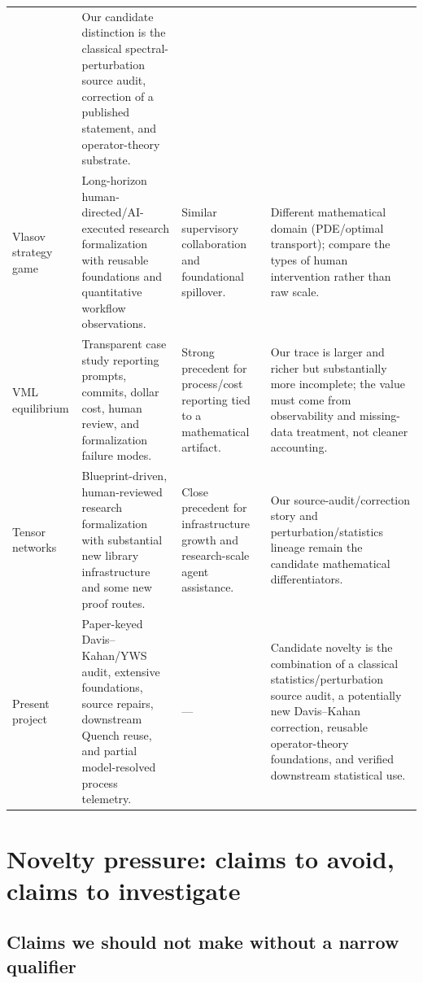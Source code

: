 \documentclass[11pt]{article}
\begin{document}
\begin{landscape}
\begin{table}[p]
\begin{tabularx}{\linewidth}{@{}p{3.0cm}p{6.2cm}p{6.2cm}X@{}}
 & Our candidate distinction is the classical spectral-perturbation source audit, correction of a published statement, and operator-theory substrate. \\
Vlasov strategy game \citep{miller2026vlasov}
 & Long-horizon human-directed/AI-executed research formalization with reusable foundations and quantitative workflow observations.
 & Similar supervisory collaboration and foundational spillover.
 & Different mathematical domain (PDE/optimal transport); compare the types of human intervention rather than raw scale. \\
VML equilibrium \citep{ilin2026vml}
 & Transparent case study reporting prompts, commits, dollar cost, human review, and formalization failure modes.
 & Strong precedent for process/cost reporting tied to a mathematical artifact.
 & Our trace is larger and richer but substantially more incomplete; the value must come from observability and missing-data treatment, not cleaner accounting. \\
Tensor networks \citep{lu2026tensor}
 & Blueprint-driven, human-reviewed research formalization with substantial new library infrastructure and some new proof routes.
 & Close precedent for infrastructure growth and research-scale agent assistance.
 & Our source-audit/correction story and perturbation/statistics lineage remain the candidate mathematical differentiators. \\
Present project
 & Paper-keyed Davis--Kahan/YWS audit, extensive foundations, source repairs, downstream Quench reuse, and partial model-resolved process telemetry.
 & ---
 & Candidate novelty is the combination of a classical statistics/perturbation source audit, a potentially new Davis--Kahan correction, reusable operator-theory foundations, and verified downstream statistical use. \\
\bottomrule
\end{tabularx}
\end{table}
\end{landscape}

\section{Novelty pressure: claims to avoid, claims to investigate}
\label{sec:novelty-pressure}

\subsection{Claims we should not make without a narrow qualifier}
\end{document}
